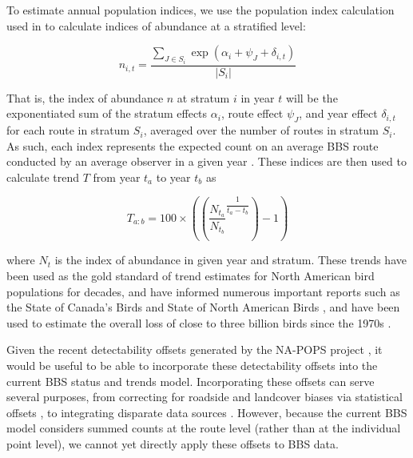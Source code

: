 \documentclass[12pt]{article}
\begin{document}
\par To estimate annual population indices, we use the population index calculation used in \citet{smith_north_2021} to calculate indices of abundance at a stratified level:

\begin{equation}\label{index}
	n_{i,t} = \dfrac{\sum_{J\in S_i}\exp(\alpha_i + \psi_J + \delta_{i,t})}{|S_i|}
\end{equation}

That is, the index of abundance $n$ at stratum $i$ in year $t$ will be the exponentiated sum of the stratum effects $\alpha_i$, route effect $\psi_J$, and year effect $\delta_{i,t}$ for each route in stratum $S_i$, averaged over the number of routes in stratum $S_i$.
As such, each index represents the expected count on an average BBS route conducted by an average observer in a given year \citep{smith_north_2021}.
These indices are then used to calculate trend $T$ from year $t_a$ to year $t_b$ as

\begin{equation*}
	T_{a:b} = 100 \times \left( \left( \dfrac{N_{t_a}}{N_{t_b}} ^ {\dfrac{1}{t_a - t_b}} \right) - 1 \right)
\end{equation*}

where $N_t$ is the index of abundance in given year and stratum.
These trends have been used as the gold standard of trend estimates for North American bird populations for decades, and have informed numerous important reports such as the State of Canada's Birds \citep{north_american_bird_conservation_initiative_canada_state_2019} and State of North American Birds \citep{north_american_bird_conservation_initiative_canada_state_2022}, and have been used to estimate the overall loss of close to three billion birds since the 1970s \citep{rosenberg_decline_2019}. 

Given the recent detectability offsets generated by the NA-POPS project \citep{edwards_point_2023}, it would be useful to be able to incorporate these detectability offsets into the current BBS status and trends model. 
Incorporating these offsets can serve several purposes, from correcting for roadside and landcover biases via statistical offsets \citep{thogmartin_sensitivity_2010, solymos_lessons_2020, edwards_point_2023}, to integrating disparate data sources \citep{solymos_calibrating_2013, edwards_point_2023}. 
However, because the current BBS model considers summed counts at the route level (rather than at the individual point level), we cannot yet directly apply these offsets to BBS data. 
\end{document}
